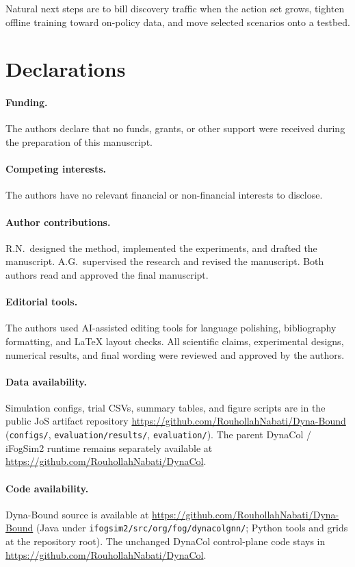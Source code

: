 \documentclass[pdflatex,sn-mathphys-num,iicol]{sn-jnl}
\begin{document}
Natural next steps are to bill discovery traffic when the action set grows,
tighten offline training toward on-policy data, and move selected scenarios onto
a testbed.

\section*{Declarations}

\paragraph{Funding.}
The authors declare that no funds, grants, or other support were received
during the preparation of this manuscript.

\paragraph{Competing interests.}
The authors have no relevant financial or non-financial interests to disclose.

\paragraph{Author contributions.}
R.N.\ designed the method, implemented the experiments, and drafted the
manuscript. A.G.\ supervised the research and revised the manuscript. Both
authors read and approved the final manuscript.

\paragraph{Editorial tools.}
The authors used AI-assisted editing tools for language polishing, bibliography
formatting, and LaTeX layout checks. All scientific claims, experimental
designs, numerical results, and final wording were reviewed and approved by the
authors.

\paragraph{Data availability.}
Simulation configs, trial CSVs, summary tables, and figure scripts are in the
public JoS artifact repository
\url{https://github.com/RouhollahNabati/Dyna-Bound}
(\texttt{configs/}, \texttt{evaluation/results/}, \texttt{evaluation/}).
The parent DynaCol / iFogSim2 runtime remains separately available at
\url{https://github.com/RouhollahNabati/DynaCol}.

\paragraph{Code availability.}
Dyna-Bound source is available at
\url{https://github.com/RouhollahNabati/Dyna-Bound}
(Java under \texttt{ifogsim2/src/org/fog/dynacolgnn/}; Python tools and grids
at the repository root). The unchanged DynaCol control-plane code stays in
\url{https://github.com/RouhollahNabati/DynaCol}.
\end{document}

